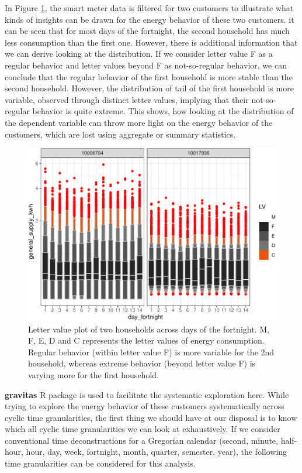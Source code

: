 \documentclass[12pt]{article}
\begin{document}
In Figure \ref{fig:day-fortnight}, the smart meter data is filtered for
two customers to illustrate what kinds of insights can be drawn for the
energy behavior of these two customers. it can be seen that for most
days of the fortnight, the second household has much less consumption
than the first one. However, there is additional information that we can
derive looking at the distribution. If we consider letter value F as a
regular behavior and letter values beyond F as not-so-regular behavior,
we can conclude that the regular behavior of the first household is more
stable than the second household. However, the distribution of tail of
the first household is more variable, observed through distinct letter
values, implying that their not-so-regular behavior is quite extreme.
This shows, how looking at the distribution of the dependent variable
can throw more light on the energy behavior of the customers, which are
lost using aggregate or summary statistics.

\begin{figure}

{\centering \includegraphics[width=\textwidth]{figure/day-fortnight-1} 

}

\caption{Letter value plot of two households across days of the fortnight. M, F, E, D and C represents the letter values of energy consumption. Regular behavior (within letter value F) is more variable for the 2nd household, whereas extreme behavior (beyond letter value F) is varying more for the first household.}\label{fig:day-fortnight}
\end{figure}

\textbf{gravitas} R package \citep{R-gravitas} is used to facilitate the
systematic exploration here. While trying to explore the energy behavior
of these customers systematically across cyclic time granularities, the
first thing we should have at our disposal is to know which all cyclic
time granularities we can look at exhaustively. If we consider
conventional time deconstructions for a Gregorian calendar (second,
minute, half-hour, hour, day, week, fortnight, month, quarter, semester,
year), the following time granularities can be considered for this
analysis.
\end{document}

